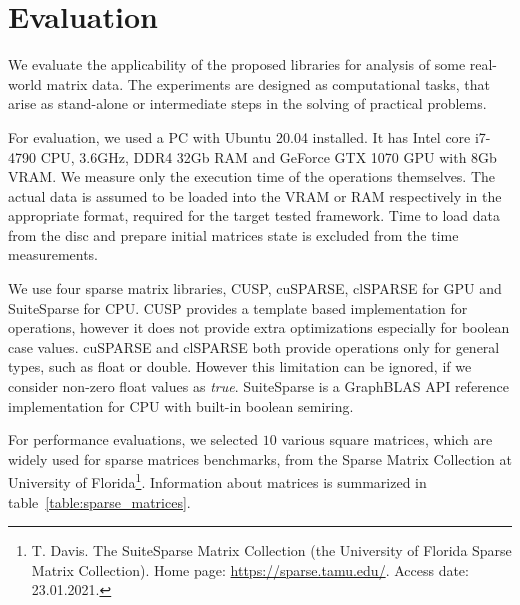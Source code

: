 \section{Evaluation}



We evaluate the applicability of the proposed libraries for analysis of some real-world matrix data.
The experiments are designed as computational tasks, that arise as stand-alone or intermediate steps in the solving of practical problems.

For evaluation, we used a PC with Ubuntu 20.04 installed.
It has Intel core i7-4790 CPU, 3.6GHz, DDR4 32Gb RAM and GeForce GTX 1070 GPU with 8Gb VRAM.
We measure only the execution time of the operations themselves.
The actual data is assumed to be loaded into the VRAM or RAM respectively in the appropriate format, required for the target tested framework.
Time to load data from the disc and prepare initial matrices state is excluded from the time measurements.

We use four sparse matrix libraries, CUSP, cuSPARSE, clSPARSE for GPU and SuiteSparse for CPU.
CUSP provides a template based implementation for operations, however it does not provide extra optimizations especially for boolean case values. cuSPARSE and clSPARSE both provide operations only for general types, such as float or double.
However this limitation can be ignored, if we consider non-zero float values as \textit{true}.
SuiteSparse is a GraphBLAS API reference implementation for CPU with built-in boolean semiring.

For performance evaluations, we selected $10$ various square matrices, which are widely used for sparse matrices benchmarks, from the Sparse Matrix Collection at University of Florida\footnote{T. Davis. The SuiteSparse Matrix Collection (the University of Florida Sparse Matrix Collection). Home page: \url{https://sparse.tamu.edu/}. Access date: 23.01.2021.}.
Information about matrices is summarized in table~\ref{table:sparse_matrices}.

